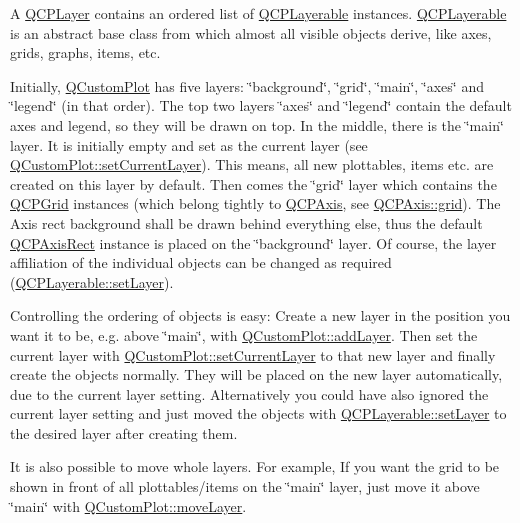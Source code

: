 A \hyperlink{class_q_c_p_layer}{Q\-C\-P\-Layer} contains an ordered list of \hyperlink{class_q_c_p_layerable}{Q\-C\-P\-Layerable} instances. \hyperlink{class_q_c_p_layerable}{Q\-C\-P\-Layerable} is an abstract base class from which almost all visible objects derive, like axes, grids, graphs, items, etc.

Initially, \hyperlink{class_q_custom_plot}{Q\-Custom\-Plot} has five layers\-: \char`\"{}background\char`\"{}, \char`\"{}grid\char`\"{}, \char`\"{}main\char`\"{}, \char`\"{}axes\char`\"{} and \char`\"{}legend\char`\"{} (in that order). The top two layers \char`\"{}axes\char`\"{} and \char`\"{}legend\char`\"{} contain the default axes and legend, so they will be drawn on top. In the middle, there is the \char`\"{}main\char`\"{} layer. It is initially empty and set as the current layer (see \hyperlink{class_q_custom_plot_a73a6dc47c653bb6f8f030abca5a11852}{Q\-Custom\-Plot\-::set\-Current\-Layer}). This means, all new plottables, items etc. are created on this layer by default. Then comes the \char`\"{}grid\char`\"{} layer which contains the \hyperlink{class_q_c_p_grid}{Q\-C\-P\-Grid} instances (which belong tightly to \hyperlink{class_q_c_p_axis}{Q\-C\-P\-Axis}, see \hyperlink{class_q_c_p_axis_ac4fb913cce3072b5e75a4635e0f6cd04}{Q\-C\-P\-Axis\-::grid}). The Axis rect background shall be drawn behind everything else, thus the default \hyperlink{class_q_c_p_axis_rect}{Q\-C\-P\-Axis\-Rect} instance is placed on the \char`\"{}background\char`\"{} layer. Of course, the layer affiliation of the individual objects can be changed as required (\hyperlink{class_q_c_p_layerable_ab0d0da6d2de45a118886d2c8e16d5a54}{Q\-C\-P\-Layerable\-::set\-Layer}).

Controlling the ordering of objects is easy\-: Create a new layer in the position you want it to be, e.\-g. above \char`\"{}main\char`\"{}, with \hyperlink{class_q_custom_plot_ad5255393df078448bb6ac83fa5db5f52}{Q\-Custom\-Plot\-::add\-Layer}. Then set the current layer with \hyperlink{class_q_custom_plot_a73a6dc47c653bb6f8f030abca5a11852}{Q\-Custom\-Plot\-::set\-Current\-Layer} to that new layer and finally create the objects normally. They will be placed on the new layer automatically, due to the current layer setting. Alternatively you could have also ignored the current layer setting and just moved the objects with \hyperlink{class_q_c_p_layerable_ab0d0da6d2de45a118886d2c8e16d5a54}{Q\-C\-P\-Layerable\-::set\-Layer} to the desired layer after creating them.

It is also possible to move whole layers. For example, If you want the grid to be shown in front of all plottables/items on the \char`\"{}main\char`\"{} layer, just move it above \char`\"{}main\char`\"{} with \hyperlink{class_q_custom_plot_ae896140beff19424e9e9e02d6e331104}{Q\-Custom\-Plot\-::move\-Layer}.

